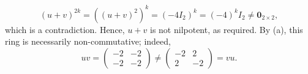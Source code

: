 \begin{solution}
\begin{enumerate}
            \[
                \left(u + v\right)^{2k} = \left(\left(u + v\right)^{2}\right)^{k} = \left(-4 I_{2}\right)^{k} = \left(-4\right)^{k} I_{2} \neq \mathbf{0}_{2 \times 2},
            \]
            which is a contradiction. Hence, \( u + v \) is not nilpotent, as required. By (a), this ring is necessarily non-commutative; indeed,
            \[
                uv = \begin{pmatrix} -2 & -2 \\ -2 & -2 \end{pmatrix} \neq \begin{pmatrix} -2 & 2 \\ 2 & -2 \end{pmatrix} = vu.
            \]
    \end{enumerate}
\end{solution}
